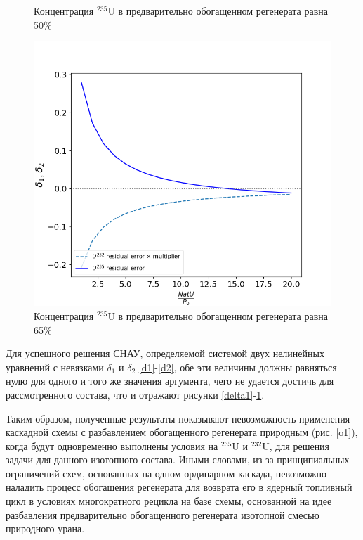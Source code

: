 \begin{figure}[ht]
\begin{minipage}{.5\textwidth}
    \caption{Концентрация $^{235}$U в предварительно обогащенном регенерата равна 50\%}
    \label{delta3}
  \end{minipage}
  \begin{minipage}{.5\textwidth}
    \centering
    \includegraphics[width=.8\linewidth]{images/plots/65}  
    \caption{Концентрация $^{235}$U в предварительно обогащенном регенерата равна 65\%}
    \label{delta4}
  \end{minipage}
 \end{figure}

Для успешного решения СНАУ, определяемой системой двух нелинейных уравнений с невязками $\delta_1$ и $\delta_2$ \ref{d1}-\ref{d2}, обе эти величины должны равняться нулю для одного и того же значения аргумента, чего не удается достичь для рассмотренного состава, что и отражают рисунки \ref{delta1}-\ref{delta4}.

Таким образом, полученные результаты показывают невозможность применения каскадной схемы с разбавлением обогащенного регенерата природным (рис. \ref{o1}), когда будут одновременно выполнены условия на $^{235}$U и $^{232}$U, для решения задачи для данного изотопного состава. Иными словами, из-за принципиальных ограничений схем, основанных на одном ординарном каскада, невозможно наладить процесс обогащения регенерата для возврата его в ядерный топливный цикл в условиях многократного рецикла на базе схемы, основанной на идее разбавления предварительно обогащенного регенерата изотопной смесью природного урана.

